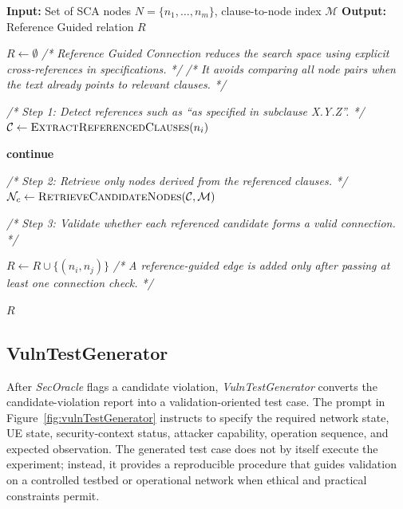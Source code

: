 \begin{algorithm}[ht]
\caption{Reference Guided Connection}
\label{alg:reference_connection}
\scriptsize
\begin{algorithmic}[1]

\State \textbf{Input:} Set of SCA nodes $N=\{n_1,\dots,n_m\}$, clause-to-node index $\mathcal{M}$
\State \textbf{Output:} Reference Guided relation $R$

\State $R \leftarrow \emptyset$
\State \textit{/* Reference Guided Connection reduces the search space using explicit cross-references in specifications. */}
\State \textit{/* It avoids comparing all node pairs when the text already points to relevant clauses. */}


    \State \textit{/* Step 1: Detect references such as ``as specified in subclause X.Y.Z''. */}
    \State $\mathcal{C} \leftarrow \textsc{ExtractReferencedClauses}(n_i)$

        \State \textbf{continue}
    \EndIf

    \State \textit{/* Step 2: Retrieve only nodes derived from the referenced clauses. */}
    \State $\mathcal{N}_c \leftarrow \textsc{RetrieveCandidateNodes}(\mathcal{C},\mathcal{M})$

    \State \textit{/* Step 3: Validate whether each referenced candidate forms a valid connection. */}


            \State $R \leftarrow R \cup \{(n_i,n_j)\}$
            \State \textit{/* A reference-guided edge is added only after passing at least one connection check. */}

        \EndIf

    \EndFor

\EndFor

\State \Return $R$

\end{algorithmic}
\end{algorithm}



\subsection{VulnTestGenerator}
After \textit{SecOracle} flags a candidate violation, \textit{VulnTestGenerator} converts the candidate-violation report into a validation-oriented test case. The prompt in Figure~\ref{fig:vulnTestGenerator} instructs \core to specify the required network state, UE state, security-context status, attacker capability, operation sequence, and expected observation. The generated test case does not by itself execute the experiment; instead, it provides a reproducible procedure that guides validation on a controlled testbed or operational network when ethical and practical constraints permit.


